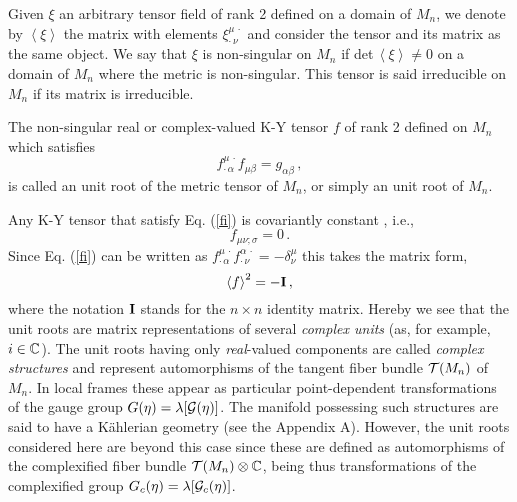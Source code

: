 \documentclass[a4paper,12pt]{article}
\begin{document}
Given $\xi$ an arbitrary tensor field of rank 2  defined on a domain of $M_n$, 
we denote by $\left<\xi\right>$ the matrix with 
elements $\xi^{\mu\,\cdot}_{\cdot\,\nu}$ and consider the tensor and its 
matrix as the same object. We say that $\xi$ is non-singular on 
$M_n$ if det$\,\left<\xi\right>\not=0$  on a domain of $M_n$ where the metric 
is non-singular. This tensor is said irreducible on $M_n$ if its matrix is 
irreducible. 
\begin{defin}\label{Def1} 
The  non-singular real or complex-valued K-Y tensor $f$ of rank 2 defined on 
$M_n$ which satisfies
\begin{equation}\label{fi}
f^{\mu\,\cdot}_{\cdot\,\alpha} f_{\mu\beta}=g_{\alpha\beta}\,,
\end{equation}
is called an unit root of the metric tensor of $M_n$, or simply an unit root 
of $M_n$.  
\end{defin}
Any K-Y tensor that satisfy Eq. (\ref{fi}) is covariantly constant \cite{K2}, 
i.e.,
\begin{equation}\label{cc}
f_{\mu\nu;\sigma}=0\,.
\end{equation}  
Since Eq. (\ref{fi}) can be written as
$f^{\mu\,\cdot}_{\cdot\,\alpha}f^{\alpha\,\cdot}_{\cdot\,\nu}=
-\delta^{\mu}_{\nu}$ 
this takes the matrix form,   
\begin{equation}\label{f2I}
\left<f\right>^2=-{\bf  I}\,,
\end{equation}
where the notation ${\bf I}$ stands for the $n\times n$ identity matrix.
Hereby we see that the unit roots are matrix representations of several 
{\em complex units} (as, for example, $i\in {\Bbb C}$). The unit roots having 
only {\em real}-valued components are called {\em complex structures}  
and represent automorphisms of the tangent fiber bundle ${\cal T}(M_n)$ of 
$M_n$. In local frames these appear as particular point-dependent
transformations of the gauge group $G(\eta)=\lambda[{\cal G}(\eta)]$. 
The manifold possessing such structures are said to have a K\" ahlerian 
geometry (see the Appendix A). However, the unit roots considered here 
are beyond this case since these are defined as automorphisms of the 
complexified fiber bundle ${\cal T}(M_n)\otimes {\Bbb C}$, being thus 
transformations of the complexified group 
$G_c(\eta)=\lambda[{\cal G}_c(\eta)]$.   
\end{document}

